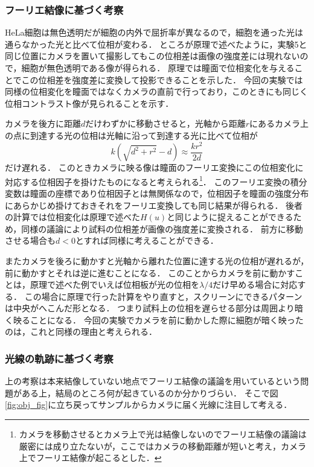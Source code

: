 \documentclass[titlepage]{jsarticle}
\begin{document}
\subsubsection{フーリエ結像に基づく考察}
HeLa細胞は無色透明だが細胞の内外で屈折率が異なるので，細胞を通った光は通らなかった光と比べて位相が変わる．
ところが原理で述べたように，実験5と同じ位置にカメラを置いて撮影してもこの位相差は画像の強度差には現れないので，細胞が無色透明である像が得られる．
原理では瞳面で位相変化を与えることでこの位相差を強度差に変換して投影できることを示した．
今回の実験では同様の位相変化を瞳面ではなくカメラの直前で行っており，このときにも同じく位相コントラスト像が見られることを示す．

カメラを後方に距離$d$だけわずかに移動させると，光軸から距離$r$にあるカメラ上の点に到達する光の位相は光軸に沿って到達する光に比べて位相が
\begin{equation}
    k(\sqrt{d^2 + r^2} - d) \approx \frac{k r^2}{2d}
    \label{cameraphase}
\end{equation}
だけ遅れる．
このときカメラに映る像は瞳面のフーリエ変換にこの位相変化に対応する位相因子を掛けたものになると考えられる\footnote{カメラを移動させるとカメラ上で光は結像しないのでフーリエ結像の議論は厳密には成り立たないが，ここではカメラの移動距離が短いと考え，カメラ上でフーリエ結像が起こるとした．}．
このフーリエ変換の積分変数は瞳面の座標であり位相因子とは無関係なので，位相因子を瞳面の強度分布にあらかじめ掛けておきそれをフーリエ変換しても同じ結果が得られる．
後者の計算では位相変化は原理で述べた$H(u)$と同じように捉えることができるため，同様の議論により試料の位相差が画像の強度差に変換される．
前方に移動させる場合も$d<0$とすれば同様に考えることができる．

またカメラを後ろに動かすと光軸から離れた位置に達する光の位相が遅れるが，前に動かすとそれは逆に進むことになる．
このことからカメラを前に動かすことは，原理で述べた例でいえば位相板が光の位相を$\lambda /4$だけ早める場合に対応する．
この場合に原理で行った計算をやり直すと，スクリーンにできるパターンは中央がへこんだ形となる．
つまり試料上の位相を遅らせる部分は周囲より暗く映ることになる．
今回の実験でカメラを前に動かした際に細胞が暗く映ったのは，これと同様の理由と考えられる．

\subsubsection{光線の軌跡に基づく考察}
上の考察は本来結像していない地点でフーリエ結像の議論を用いているという問題がある上，結局のところ何が起きているのか分かりづらい．
そこで図\ref{fig:obj_fig}に立ち戻ってサンプルからカメラに届く光線に注目して考える．
\end{document}
